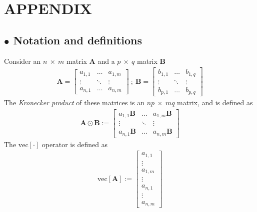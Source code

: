 \documentclass[11pt]{amsart}
\begin{document}
 \section*{APPENDIX}
\subsection*{$\bullet$ Notation and definitions}
Consider an $n \ \times \ m$ matrix $\boldsymbol{A}$ and a $p \ \times \ q$ matrix $\boldsymbol{B}$
\begin{align*}
\boldsymbol{A} = \left[ \begin{array}{ccc} a_{1,1} & \hdots & a_{1,m}  \\
\vdots & \ddots & \vdots \\
a_{n,1} & \hdots & a_{n,m} \end{array} \right] \ ; \ \boldsymbol{B} = \left[ \begin{array}{ccc} b_{1,1} & \hdots & b_{1,q}  \\
\vdots & \ddots & \vdots \\
b_{p,1} & \hdots & b_{p,q} \end{array} \right]
\end{align*}
The \emph{Kronecker product} of these matrices is an $np \ \times \ mq$ matrix, and is defined as
\begin{align*}
\boldsymbol{A} \odot \boldsymbol{B} := \left[ \begin{array}{ccc} a_{1,1}\boldsymbol{B} & \hdots & a_{1,m}\boldsymbol{B}  \\
\vdots & \ddots & \vdots \\
a_{n,1}\boldsymbol{B} & \hdots & a_{n,m}\boldsymbol{B} \end{array} \right]
\end{align*}
The $\mathrm{vec}[\cdot]$ operator is defined as
\begin{align*}
\mathrm{vec}[\boldsymbol{A}] := \left[ \begin{array}{c} a_{1,1} \\
\vdots \\
a_{1,m} \\
\vdots \\
a_{n,1} \\
\vdots \\
a_{n,m} \end{array} \right]
\end{align*}
\end{document}
